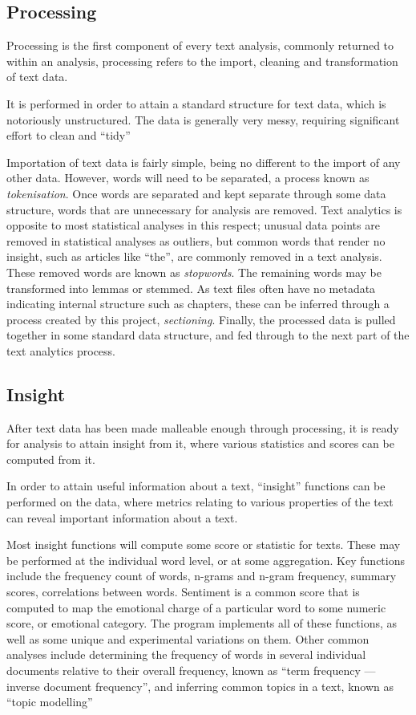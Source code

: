 \documentclass[11pt, a4paper, twoside, titlepage]{report}
\begin{document}
\subsection{Processing}\label{sec:processing}

Processing is the first component of every text analysis, commonly
returned to within an analysis, processing refers to the import,
cleaning and transformation of text data.

It is performed in order to attain a standard structure for text data,
which is notoriously unstructured. The data is generally very messy,
requiring significant effort to clean and ``tidy''

Importation of text data is fairly simple, being no different to the
import of any other data. However, words will need to be separated, a
process known as \textit{tokenisation}. Once words are separated and
kept separate through some data structure, words that are unnecessary
for analysis are removed. Text analytics is opposite to most
statistical analyses in this respect; unusual data points are removed
in statistical analyses as outliers, but common words that render no
insight, such as articles like ``the'', are commonly removed in a text
analysis. These removed words are known as \textit{stopwords}. The
remaining words may be transformed into lemmas or stemmed. As text
files often have no metadata indicating internal structure such as
chapters, these can be inferred through a process created by this
project, \textit{sectioning}. Finally, the processed data is pulled
together in some standard data structure, and fed through to the next
part of the text analytics process.

\subsection{Insight}\label{sec:insight-1}

After text data has been made malleable enough through processing, it
is ready for analysis to attain insight from it, where various
statistics and scores can be computed from it.

In order to attain useful information about a text, ``insight''
functions can be performed on the data, where metrics relating to
various properties of the text can reveal important information about
a text.

Most insight functions will compute some score or statistic for texts.
These may be performed at the individual word level, or at some
aggregation. Key functions include the frequency count of words,
n-grams and n-gram frequency, summary scores, correlations between
words. Sentiment is a common score that is computed to map the
emotional charge of a particular word to some numeric score, or
emotional category. The program implements all of these functions, as
well as some unique and experimental variations on them. Other common
analyses include determining the frequency of words in several
individual documents relative to their overall frequency, known as
``term frequency --- inverse document frequency'', and inferring
common topics in a text, known as ``topic modelling''
\end{document}
